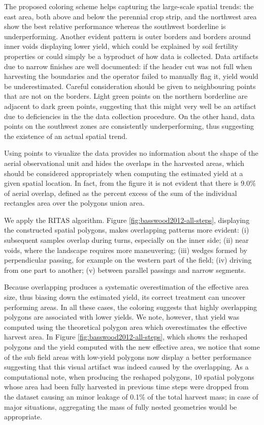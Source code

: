  The proposed coloring scheme helps
capturing the large-scale spatial trends: the east area, both above
and below the perennial crop strip, and the northwest area show the
best relative performance whereas the southwest borderline is
underperforming. Another evident pattern is outer borders and borders
around inner voids displaying lower yield, which could be explained by
soil fertility properties or could simply be a byproduct of how data
is collected. Data artifacts due to narrow finishes are well
documented: if the header cut was not full when harvesting the
boundaries and the operator failed to manually flag it, yield would be
underestimated. Careful consideration should be given to neighbouring
points that are not on the borders. Light green points on the northern
borderline are adjacent to dark green points, suggesting that this
might very well be an artifact due to deficiencies in the the data
collection procedure. On the other hand, data points on the southwest
zones are consistently underperforming, thus suggesting the existence
of an actual spatial trend.

 Using points to visualize the data
provides no information about the shape of the aerial observational
unit and hides the overlaps in the harvested areas, which should be
considered appropriately when computing the estimated yield at a given
spatial location. In fact, from the figure it is not evident that
there is 9.0\% of aerial overlap, defined as the percent excess of the
sum of the individual rectangles area over the polygons union area.

 We apply the RITAS algorithm. Figure
\ref{fig:basswood2012-all-steps}, displaying the constructed spatial
polygons, makes overlapping patterns more evident: (i) subsequent
samples overlap during turns, especially on the inner side; (ii) near
voids, where the landscape requires more maneuvering; (iii) wedges
formed by perpendicular passing, for example on the western part of
the field; (iv) driving from one part to another; (v) between parallel
passings and narrow segments.

 Because overlapping produces a systematic
overestimation of the effective area size, thus biasing down the
estimated yield, its correct treatment can uncover performing
areas. In all these cases, the coloring suggests that highly
overlapping polygons are associated with lower yields. We note,
however, that yield was computed using the theoretical polygon area
which overestimates the effective harvest area. In Figure
\ref{fig:basswood2012-all-steps}, which shows the reshaped polygons
and the yield computed with the new effective area, we notice that
some of the sub field areas with low-yield polygons now display a
better performance suggesting that this visual artifact was indeed
caused by the overlapping. As a computational note, when producing the
reshaped polygons, 10 spatial polygons whose area had been fully
harvested in previous time steps were dropped from the dataset causing
an minor leakage of 0.1\% of the total harvest mass; in case of major
situations, aggregating the mass of fully nested geometries would be
appropriate.

